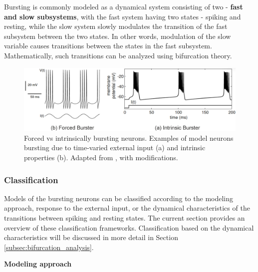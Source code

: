 \documentclass[../main.tex]{subfiles}
\begin{document}
Bursting is commonly modeled as a dynamical system consisting of two - \textbf{fast and slow subsystems}, with the fast system having two states - spiking and resting, while the slow system slowly modulates the transition of the fast subsystem between the two states. 
In other words, modulation of the slow variable causes transitions between the states in the fast subsystem. Mathematically, such transitions can be analyzed using bifurcation theory.

\begin{figure}[!t]
    \centering
    \includegraphics[width=0.85\linewidth]{../img/modeling_r5/examples/intrinsic_vs_forced_burster.png}
    \caption[Forced vs intrinsically bursting neurons]{
        Forced vs intrinsically bursting neurons. Examples of model neurons bursting due to time-varied external input (a) and intrinsic
        properties (b). Adapted from \parencite{izhikevichDynamicalSystemsNeuroscience2006}, with modifications.
    }
    \label{fig:example_forced_intrinsic_bursters}
\end{figure}

\subsubsection{Classification} \label{subsubsec:math_bursting_classification}

Models of the bursting neurons can be classified according to the modeling approach, response to the external input, or the dynamical characteristics of the transitions between spiking and resting states. The current section provides an overview of these classification frameworks. Classification based on the dynamical characteristics will be discussed in more detail in Section \ref{subsec:bifurcation_analysis}.

\vspace*{0.3cm}
\noindent\textbf{Modeling approach}
\end{document}
